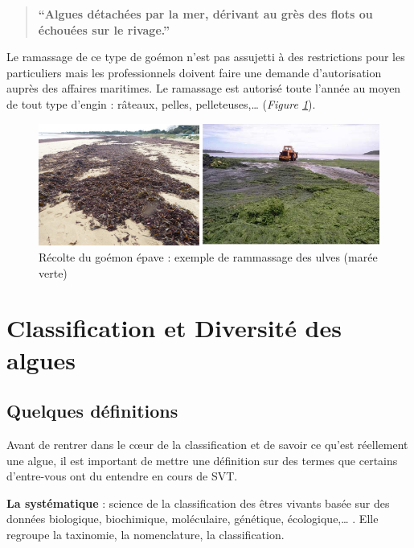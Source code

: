 \documentclass[
]{book}
\begin{document}
\begin{quote}
\textbf{``Algues détachées par la mer, dérivant au grès des flots ou échouées sur le rivage.''}
\end{quote}

Le ramassage de ce type de goémon n'est pas assujetti à des restrictions pour les particuliers mais les professionnels doivent faire une demande d'autorisation auprès des affaires maritimes. Le ramassage est autorisé toute l'année au moyen de tout type d'engin : râteaux, pelles, pelleteuses,\ldots{} (\emph{Figure \ref{fig:goemonepave}}).

\begin{figure}

{\centering \includegraphics{images/goemon_epave} 

}

\caption{Récolte du goémon épave : exemple de rammassage des ulves (marée verte)}\label{fig:goemonepave}
\end{figure}

\hypertarget{classification}{%
\chapter{Classification et Diversité des algues}\label{classification}}

\hypertarget{quelques-duxe9finitions}{%
\section{Quelques définitions}\label{quelques-duxe9finitions}}

Avant de rentrer dans le cœur de la classification et de savoir ce qu'est réellement une algue, il est important de mettre une définition sur des termes que certains d'entre-vous ont du entendre en cours de SVT.

\textbf{La systématique} : science de la classification des êtres vivants basée sur des données biologique, biochimique, moléculaire, génétique, écologique,\ldots{} . Elle regroupe la taxinomie, la nomenclature, la classification.
\end{document}
